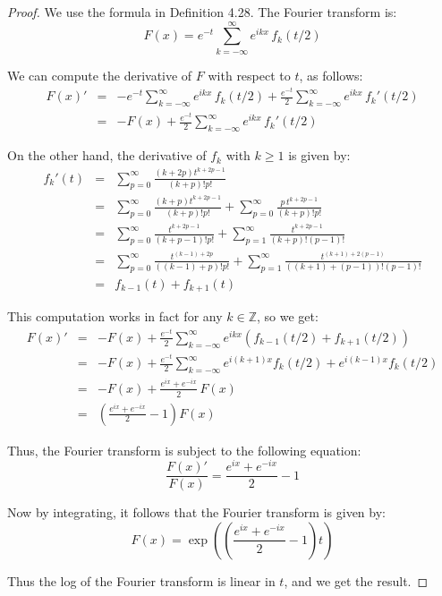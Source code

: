 \documentclass[12pt]{amsbook}
\begin{document}
\begin{proof}
We use the formula in Definition 4.28. The Fourier transform is:
$$F(x)=e^{-t}\sum_{k=-\infty}^\infty e^{ikx}\,f_k(t/2)$$

We can compute the derivative of $F$ with respect to $t$, as follows:
\begin{eqnarray*}
F(x)'
&=&-e^{-t}\sum_{k=-\infty}^\infty e^{ikx}\,f_k(t/2)+\frac{e^{-t}}{2}\sum_{k=-\infty}^\infty e^{ikx}\,f_k'(t/2)\\
&=&-F(x)+\frac{e^{-t}}{2}\sum_{k=-\infty}^\infty e^{ikx}\,f_k'(t/2)
\end{eqnarray*}

On the other hand, the derivative of $f_k$ with $k\geq 1$ is given by:
\begin{eqnarray*}
f_k'(t)
&=&\sum_{p=0}^\infty \frac{(k+2p)t^{k+2p-1}}{(k+p)!p!}\\
&=&\sum_{p=0}^\infty \frac{(k+p)t^{k+2p-1}}{(k+p)!p!}+\sum_{p=0}^\infty\frac{p\,t^{k+2p-1}}{(k+p)!p!}\\
&=&\sum_{p=0}^\infty \frac{t^{k+2p-1}}{(k+p-1)!p!}+\sum_{p=1}^\infty\frac{t^{k+2p-1}}{(k+p)!(p-1)!}\\
&=&\sum_{p=0}^\infty \frac{t^{(k-1)+2p}}{((k-1)+p)!p!}+\sum_{p=1}^\infty\frac{t^{(k+1)+2(p-1)}}{((k+1)+(p-1))!(p-1)!}\\
&=&f_{k-1}(t)+f_{k+1}(t)
\end{eqnarray*}

This computation works in fact for any $k\in\mathbb Z$, so we get:
\begin{eqnarray*}
F(x)'
&=&-F(x)+\frac{e^{-t}}{2}
\sum_{k=-\infty}^\infty e^{ikx} (f_{k-1}(t/2)+f_{k+1}(t/2))\\
&=&-F(x)+\frac{e^{-t}}{2} \sum_{k=-\infty}^\infty
e^{i(k+1)x}f_{k}(t/2)+e^{i(k-1)x}f_{k}(t/2)\\
&=&-F(x)+\frac{e^{ix}+e^{-ix}}{2}\,F(x)\\
&=&\left(\frac{e^{ix}+e^{-ix}}{2}-1\right)F(x)
\end{eqnarray*}

Thus, the Fourier transform is subject to the following equation:
$$\frac{F(x)'}{F(x)}=\frac{e^{ix}+e^{-ix}}{2}-1$$

Now by integrating, it follows that the Fourier transform is given by:
$$F(x)=\exp\left(\left(\frac{e^{ix}+e^{-ix}}{2}-1\right)t\right)$$

Thus the log of the Fourier transform is linear in $t$, and we get the result.
\end{proof}
\end{document}
